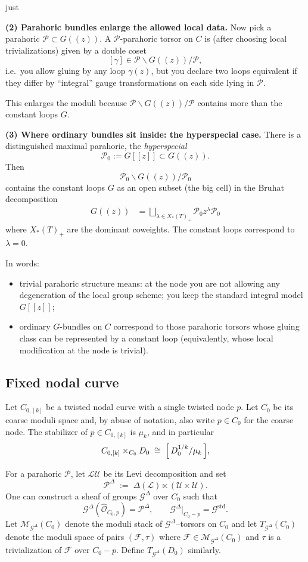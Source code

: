 just \documentclass[12pt]{article}
\begin{document}
\medskip
\noindent\textbf{(2) Parahoric bundles enlarge the allowed local data.}
Now pick a parahoric $\mathcal P\subset G((z))$. A $\mathcal P$-parahoric torsor on $C$ is (after choosing local trivializations) given by a double coset
\[
[\gamma]\in \mathcal P\backslash G((z))/\mathcal P,
\]
i.e.\ you allow gluing by any loop $\gamma(z)$, but you declare two loops equivalent if they differ by ``integral'' gauge transformations on each side lying in $\mathcal P$.

This enlarges the moduli because $\mathcal P\backslash G((z))/\mathcal P$ contains more than the constant loops $G$.

\medskip
\noindent\textbf{(3) Where ordinary bundles sit inside: the hyperspecial case.}
There is a distinguished maximal parahoric, the \emph{hyperspecial}
\[
\mathcal P_0:=G[[z]]\subset G((z)).
\]
Then
\[
\mathcal P_0\backslash G((z))/\mathcal P_0
\]
contains the constant loops $G$ as an open subset (the big cell) in the Bruhat decomposition
\begin{align*}
G((z)) &= \bigsqcup_{\lambda\in X_*(T)_+} \mathcal P_0 z^\lambda \mathcal P_0 
\end{align*} where $X_*(T)_+$ are the dominant coweights. The constant loops correspond to $\lambda=0$.

In words:
\begin{itemize}
\item trivial parahoric structure means: at the node you are not allowing any degeneration of the local group scheme; you keep the standard integral model $G[[z]]$;
\item ordinary $G$-bundles on $C$ correspond to those parahoric torsors whose gluing class can be represented by a constant loop (equivalently, whose local modification at the node is trivial).
\end{itemize}



\subsection*{Fixed nodal curve}

Let $C_{0,[k]}$ be a twisted nodal curve with a single twisted node $p$.
Let $C_0$ be its coarse moduli space and, by abuse of notation, also write
$p\in C_0$ for the coarse node. The stabilizer of $p\in C_{0,[k]}$ is $\mu_k$,
and in particular
\[
C_{0,[k]}\times_{C_0} D_0 \;\cong\; \Bigl[\,D_0^{1/k}/\mu_k\,\Bigr],
\]

For a parahoric $\mathcal P$, let $\mathcal L\mathcal U$ be its Levi
decomposition and set
\[
\mathcal P^{\Delta} \;:=\; \Delta(\mathcal L)\ltimes (\mathcal U\times \mathcal U).
\]
One can construct a sheaf of groups $\mathcal G^{\Delta}$
over $C_0$ such that
\[
\mathcal G^{\Delta}(\widehat{\mathcal O}_{C_0,p})=\mathcal P^{\Delta},
\qquad
\mathcal G^{\Delta}\big|_{C_0-p}=\mathcal G^{\mathrm{std}}.
\]
Let $\mathcal M_{\mathcal G^{\Delta}}(C_0)$ denote the moduli stack of
$\mathcal G^{\Delta}$--torsors on $C_0$ and let $T_{\mathcal G^{\Delta}}(C_0)$
denote the moduli space of pairs $(\mathcal F,\tau)$ where
$\mathcal F\in \mathcal M_{\mathcal G^{\Delta}}(C_0)$ and $\tau$ is a
trivialization of $\mathcal F$ over $C_0-p$. Define $T_{\mathcal G^{\Delta}}(D_0)$
similarly.
\end{document}
